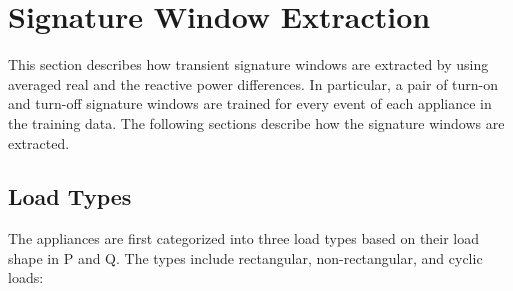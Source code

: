 \documentclass[conference]{IEEEtran}
\begin{document}
%
%
%

\section{Signature Window Extraction}\label{sec:training}
This section describes how transient signature windows are extracted by using averaged real and the reactive power differences.  In particular, a pair of turn-on and turn-off signature windows are trained for every event of each appliance in the training data.  The following sections describe how the signature windows are extracted.  


\subsection{Load Types}
The appliances are first categorized into three load types based on their load shape in P and Q.  The types include rectangular, non-rectangular, and cyclic loads:
\end{document}
